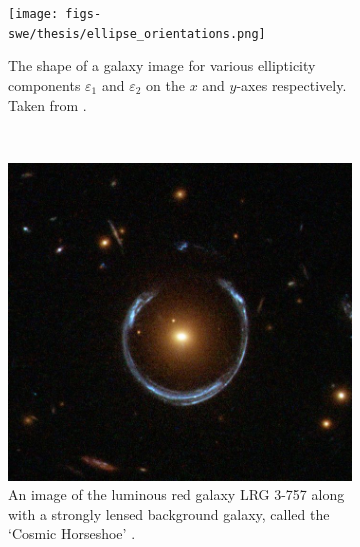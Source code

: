 \documentclass[%
 reprint,
 amsmath,amssymb,
 aps,nofootinbib
]{revtex4-1}
\begin{document}
\begin{figure}
    \centering
    \begin{subfigure}[H]{0.415\textwidth}
        \texttt{[image: figs-swe/thesis/ellipse\_orientations.png]}
        \captionsetup{justification=raggedright,singlelinecheck=false}
        \caption{The shape of a galaxy image for various ellipticity components $\varepsilon_1$ and $\varepsilon_2$ on the $x$ and $y$-axes respectively. Taken from \cite{schneider}.}
        \label{ellipses}
    \end{subfigure}
    ~
    \begin{subfigure}[H]{0.425\textwidth}
        \includegraphics[width=\textwidth]{figs-swe/thesis/einstein_ring.png}
        \captionsetup{justification=raggedright,singlelinecheck=false}
        \caption{An image of the luminous red galaxy LRG 3-757 along with a strongly lensed background galaxy, called the `Cosmic Horseshoe' \cite{einstein_ring}.}
        \label{einstein_ring}
    \end{subfigure}
    \caption{}
\end{figure}
\end{document}
